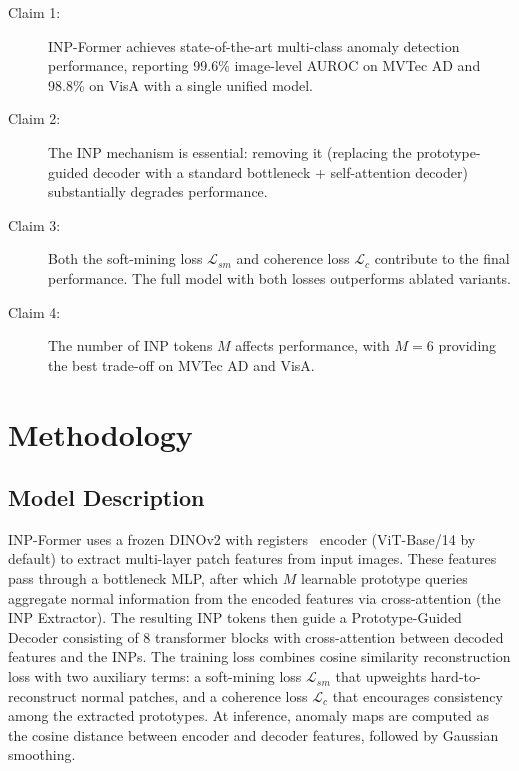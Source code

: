 \documentclass[10pt]{article} %
\begin{document}
\begin{description}
    \item[Claim 1:] INP-Former achieves state-of-the-art multi-class anomaly detection performance, reporting 99.6\% image-level AUROC on MVTec AD and 98.8\% on VisA with a single unified model.

    \item[Claim 2:] The INP mechanism is essential: removing it (replacing the prototype-guided decoder with a standard bottleneck + self-attention decoder) substantially degrades performance.

    \item[Claim 3:] Both the soft-mining loss $\mathcal{L}_{sm}$ and coherence loss $\mathcal{L}_c$ contribute to the final performance. The full model with both losses outperforms ablated variants.

    \item[Claim 4:] The number of INP tokens $M$ affects performance, with $M=6$ providing the best trade-off on MVTec AD and VisA.
\end{description}


\section{Methodology}
\label{sec:methodology}

\subsection{Model Description}

INP-Former uses a frozen DINOv2 with registers~\citep{darcet2024registers} encoder (ViT-Base/14 by default) to extract multi-layer patch features from input images. These features pass through a bottleneck MLP, after which $M$ learnable prototype queries aggregate normal information from the encoded features via cross-attention (the INP Extractor). The resulting INP tokens then guide a Prototype-Guided Decoder consisting of 8 transformer blocks with cross-attention between decoded features and the INPs. The training loss combines cosine similarity reconstruction loss with two auxiliary terms: a soft-mining loss $\mathcal{L}_{sm}$ that upweights hard-to-reconstruct normal patches, and a coherence loss $\mathcal{L}_c$ that encourages consistency among the extracted prototypes. At inference, anomaly maps are computed as the cosine distance between encoder and decoder features, followed by Gaussian smoothing.
\end{document}
